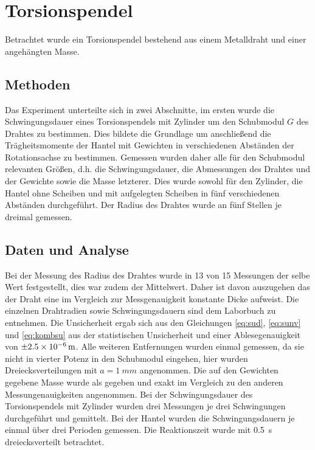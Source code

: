 \clearpage
\section{Torsionspendel}
Betrachtet wurde ein Torsionspendel bestehend aus einem Metalldraht und einer angehängten Masse.

\subsection{Methoden}
Das Experiment unterteilte sich in zwei Abschnitte, im ersten wurde die Schwingungsdauer eines Torsionspendels mit Zylinder um den Schubmodul $G$ des Drahtes zu bestimmen. Dies bildete die Grundlage um anschließend die Trägheitsmomente der Hantel mit Gewichten in verschiedenen Abständen der Rotationsachse zu bestimmen.
Gemessen wurden daher alle für den Schubmodul relevanten Größen, d.h. die Schwingungsdauer, die Abmessungen des Drahtes und der Gewichte sowie die Masse letzterer. Dies wurde sowohl für den Zylinder, die Hantel ohne Scheiben und mit aufgelegten Scheiben in fünf verschiedenen Abständen durchgeführt. Der Radius des Drahtes wurde an fünf Stellen je dreimal gemessen.


\subsection{Daten und Analyse}
 Bei der Messung des Radius des Drahtes wurde in 13 von 15 Messungen der selbe Wert festgestellt, dies war zudem der Mittelwert. Daher ist davon auszugehen das der Draht eine im Vergleich zur Messgenauigkeit konstante Dicke aufweist. Die einzelnen Drahtradien sowie Schwingungsdauern sind dem Laborbuch zu entnehmen. Die Unsicherheit ergab sich aus den Gleichungen \ref{eq:sud}, \ref{eq:sunv} und \ref{eq:kombsu} aus der statistischen Unsicherheit und einer Ablesegenauigkeit von $\SI{\pm 2.5e-6}{m}$.
 Alle weiteren Entfernungen wurden einmal gemessen, da sie nicht in vierter Potenz in den Schubmodul eingehen, hier wurden Dreiecksverteilungen mit $a=\SI{1}{mm}$ angenommen. Die auf den Gewichten gegebene Masse wurde als gegeben und exakt im Vergleich zu den anderen Messungenauigkeiten angenommen. Bei der Schwingungsdauer des Torsionspendels mit Zylinder wurden drei Messungen je drei Schwingungen durchgeführt und gemittelt. Bei der Hantel wurden die Schwingungsdauern je einmal über drei Perioden gemessen. Die Reaktionszeit wurde mit \SI{0.5}{s} dreiecksverteilt betrachtet.\\
 
